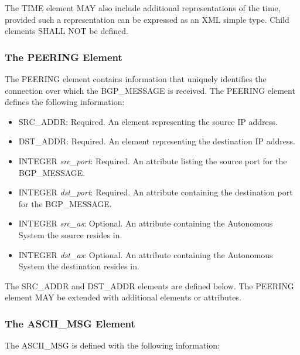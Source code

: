 \documentclass{article}
\begin{document}
The TIME element MAY also include additional representations of the time, provided such a representation can be expressed as an XML simple type.  Child elements SHALL NOT be defined.

\subsubsection{The PEERING Element}
\label{PEER}
The PEERING element contains information that uniquely identifies the connection over which the BGP_MESSAGE is received.  The PEERING element defines the following information:

\begin{itemize}
\item{SRC_ADDR: Required. An element representing the source IP address.}
\item{DST_ADDR: Required. An element representing the destination IP address.}
\item{INTEGER \emph{src_port}: Required. An attribute listing the source port for the BGP_MESSAGE.}
\item{INTEGER \emph{dst_port}: Required. An attribute containing the destination port for the BGP_MESSAGE.}
\item{INTEGER \emph{src_as}: Optional. An attribute containing the Autonomous System the source resides in.}
\item{INTEGER \emph{dst_as}: Optional. An attribute containing the Autonomous System the destination resides in.}
\end{itemize}

The SRC_ADDR and DST_ADDR elements are defined below.  The PEERING element MAY be extended with additional elements or attributes.

\subsubsection{The ASCII_MSG Element}
\label{ASCII}

The ASCII_MSG is defined with the following information:
\end{document}
